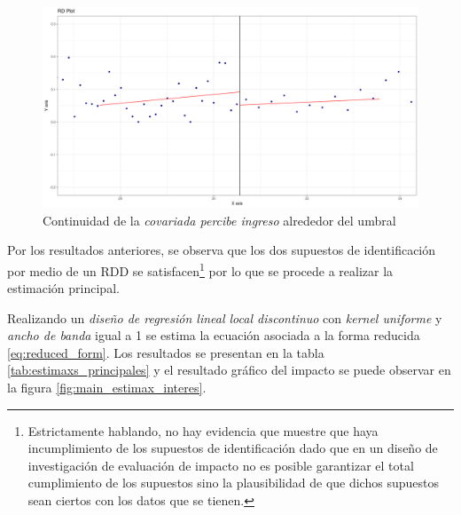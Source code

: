 \documentclass[AER]{AEA}
\begin{document}
\clearpage

\begin{figure}[h]
    \centering
    \includegraphics[scale = 0.35]{imagenes/estimax_principal/percibe_ingreso_main.png}
    \caption{Continuidad de la \textit{covariada percibe ingreso} alrededor del umbral}
    \label{fig:percibe_ingreso}
\end{figure}

Por los resultados anteriores, se observa que los dos supuestos de identificación por medio de un RDD se satisfacen\footnote{Estrictamente hablando, no hay evidencia que muestre que haya incumplimiento de los supuestos de identificación dado que en un diseño de investigación de evaluación de impacto no es posible garantizar el total cumplimiento de los supuestos sino la plausibilidad de que dichos supuestos sean ciertos con los datos que se tienen.} por lo que se procede a realizar la estimación principal.

Realizando un \textit{diseño de regresión lineal local discontinuo} con \textit{kernel uniforme} y \textit{ancho de banda} igual a 1 se estima la ecuación asociada a la forma reducida \ref{eq:reduced_form}. Los resultados se presentan en la tabla \ref{tab:estimaxs_principales} y el resultado gráfico del impacto se puede observar en la figura \ref{fig:main_estimax_interes}. 
\end{document}
